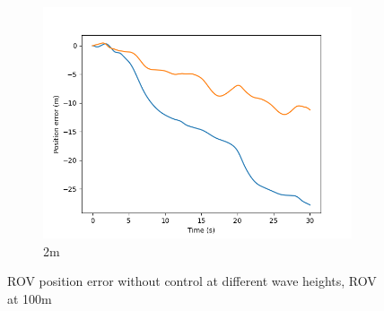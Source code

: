 \documentclass[class=article, crop=false]{standalone}
\begin{document}
\begin{figure}
\begin{subfigure}[b]{0.48\textwidth}
        \includegraphics{scenario1/rov-100m/2.0m/rov_position_error_uncontrolled}
        \caption{2m}
        \label{}
    \end{subfigure}

    \caption{ROV position error without control at different wave heights, ROV at 100m}
\end{figure}
\FloatBarrier
\end{document}
